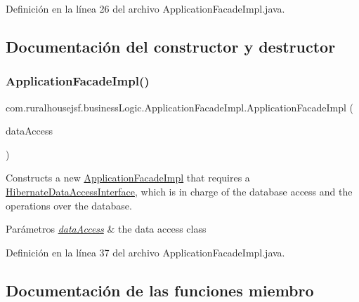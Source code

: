 Definición en la línea 26 del archivo Application\+Facade\+Impl.\+java.



\subsection{Documentación del constructor y destructor}
\mbox{\label{classcom_1_1ruralhousejsf_1_1business_logic_1_1_application_facade_impl_ad6ed360c754c5ba82a2b88bb4cf036f7}} 
\subsubsection{\texorpdfstring{ApplicationFacadeImpl()}{ApplicationFacadeImpl()}}
{\footnotesize\ttfamily com.\+ruralhousejsf.\+business\+Logic.\+Application\+Facade\+Impl.\+Application\+Facade\+Impl (\begin{DoxyParamCaption}\item[{\mbox{\hyperlink{interfacecom_1_1ruralhousejsf_1_1data_access_1_1_hibernate_data_access_interface}{Hibernate\+Data\+Access\+Interface}}}]{data\+Access }\end{DoxyParamCaption})}

Constructs a new \mbox{\hyperlink{classcom_1_1ruralhousejsf_1_1business_logic_1_1_application_facade_impl}{Application\+Facade\+Impl}} that requires a \mbox{\hyperlink{}{Hibernate\+Data\+Access\+Interface}}, which is in charge of the database access and the operations over the database.


\begin{DoxyParams}{Parámetros}
{\em \mbox{\hyperlink{namespacecom_1_1ruralhousejsf_1_1data_access}{data\+Access}}} & the data access class \\
\hline
\end{DoxyParams}


Definición en la línea 37 del archivo Application\+Facade\+Impl.\+java.



\subsection{Documentación de las funciones miembro}
\mbox{\label{classcom_1_1ruralhousejsf_1_1business_logic_1_1_application_facade_impl_ae48e63f3df5226e46e4a57a64d120823}} 
